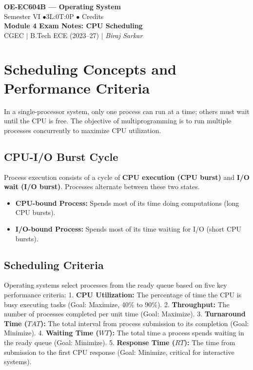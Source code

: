 \documentclass[12pt,a4paper]{article}
\begin{document}

\begin{center}
  {\LARGE\bfseries\color{myred} OE-EC604B --- Operating System}\\[5pt]
  {\normalsize\color{mydark} Semester VI \quad$\bullet$\quad 3L:0T:0P \quad$\bullet$ Credits}\\[3pt]
  {\normalsize\color{myteal}\textbf{Module 4 Exam Notes: CPU Scheduling}}\\[3pt]
  {\small\color{mydark} CGEC \;$|$\; B.Tech ECE (2023--27) \;$|$\; \textit{Biraj Sarkar}}
\end{center}
\vspace{2pt}
\noindent{\color{myred}\rule{\linewidth}{1.5pt}}
\vspace{2pt}

\hypersetup{linkcolor=mydark}
\tableofcontents
\hypersetup{linkcolor=myteal}
\newpage

\section{Scheduling Concepts and Performance Criteria}

In a single-processor system, only one process can run at a time; others must wait until the CPU is free. The objective of multiprogramming is to run multiple processes concurrently to maximize CPU utilization.

\subsection{CPU-I/O Burst Cycle}
Process execution consists of a cycle of \textbf{CPU execution (CPU burst)} and \textbf{I/O wait (I/O burst)}. Processes alternate between these two states.
\begin{itemize}[leftmargin=*, itemsep=3pt]
  \item \textbf{CPU-bound Process:} Spends most of its time doing computations (long CPU bursts).
  \item \textbf{I/O-bound Process:} Spends most of its time waiting for I/O (short CPU bursts).
\end{itemize}

\subsection{Scheduling Criteria}
Operating systems select processes from the ready queue based on five key performance criteria:
1. \textbf{CPU Utilization:} The percentage of time the CPU is busy executing tasks (Goal: Maximize, 40\% to 90\%).
2. \textbf{Throughput:} The number of processes completed per unit time (Goal: Maximize).
3. \textbf{Turnaround Time ($TAT$):} The total interval from process submission to its completion (Goal: Minimize).
4. \textbf{Waiting Time ($WT$):} The total time a process spends waiting in the ready queue (Goal: Minimize).
5. \textbf{Response Time ($RT$):} The time from submission to the first CPU response (Goal: Minimize, critical for interactive systems).
\end{document}
